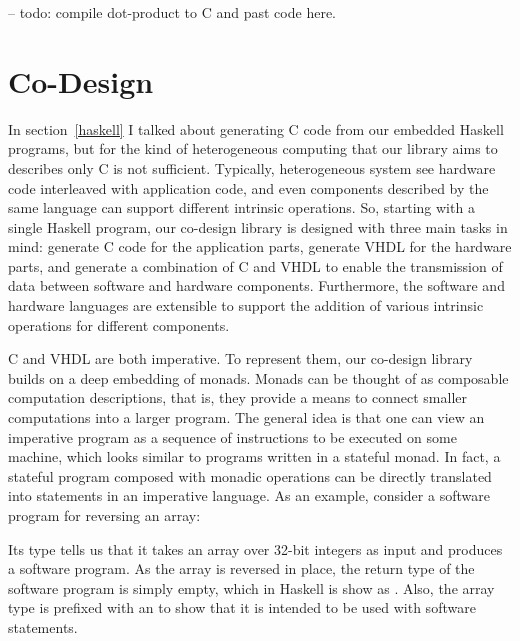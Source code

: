 \begin{code}
-- todo: compile dot-product to C and past code here.
\end{code}


\section{Co-Design}
\label{codesign}

In section~\ref{haskell} I talked about generating C code from our embedded Haskell programs, but for the kind of heterogeneous computing that our library aims to describes only C is not sufficient. Typically, heterogeneous system see hardware code interleaved with application code, and even components described by the same language can support different intrinsic operations. So, starting with a single Haskell program, our co-design library is designed with three main tasks in mind: generate C code for the application parts, generate VHDL for the hardware parts, and generate a combination of C and VHDL to enable the transmission of data between software and hardware components. Furthermore, the software and hardware languages are extensible to support the addition of various intrinsic operations for different components.

C and VHDL are both imperative. To represent them, our co-design library builds on a deep embedding of monads. Monads can be thought of as composable computation descriptions, that is, they provide a means to connect smaller computations into a larger program. The general idea is that one can view an imperative program as a sequence of instructions to be executed on some machine, which looks similar to programs written in a stateful monad. In fact, a stateful program composed with monadic operations can be directly translated into statements in an imperative language. As an example, consider a software program for reversing an array:


\noindent Its type tells us that it takes an array over 32-bit integers as input and produces a software program. As the array is reversed in place, the return type of the software program is simply empty, which in Haskell is show as \codei{()}. Also, the array type  is prefixed with an  to show that it is intended to be used with software statements. %

